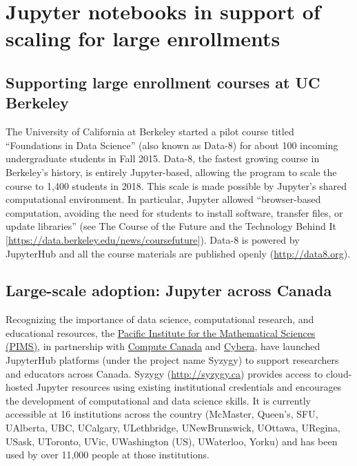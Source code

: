\documentclass[]{book}
\begin{document}
\section{Jupyter notebooks in support of scaling for large
enrollments}\label{jupyter-notebooks-in-support-of-scaling-for-large-enrollments}

\subsection{Supporting large enrollment courses at UC
Berkeley}\label{supporting-large-enrollment-courses-at-uc-berkeley}

The University of California at Berkeley started a pilot course titled
``Foundations in Data Science'' (also known as Data-8) for about 100
incoming undergraduate students in Fall 2015. Data-8, the fastest
growing course in Berkeley's history, is entirely Jupyter-based,
allowing the program to scale the course to 1,400 students in 2018. This
scale is made possible by Jupyter's shared computational environment. In
particular, Jupyter allowed ``browser-based computation, avoiding the
need for students to install software, transfer files, or update
libraries'' (see The Course of the Future and the Technology Behind It
{[}\url{https://data.berkeley.edu/news/coursefuture}{]}). Data-8 is
powered by JupyterHub and all the course materials are published openly
(\url{http://data8.org}).

\subsection{Large-scale adoption: Jupyter across
Canada}\label{large-scale-adoption-jupyter-across-canada}

Recognizing the importance of data science, computational research, and
educational resources, the \href{https://www.pims.math.ca/}{Pacific
Institute for the Mathematical Sciences (PIMS)}, in partnership with
\href{https://www.computecanada.ca/}{Compute Canada} and
\href{https://www.cybera.ca/}{Cybera}, have launched JupyterHub
platforms (under the project name Syzygy) to support researchers and
educators across Canada. Syzygy (\url{http://syzygy.ca}) provides access
to cloud-hosted Jupyter resources using existing institutional
credentials and encourages the development of computational and data
science skills. It is currently accessible at 16 institutions across the
country (McMaster, Queen's, SFU, UAlberta, UBC, UCalgary, ULethbridge,
UNewBrunswick, UOttawa, URegina, USask, UToronto, UVic, UWashington
(US), UWaterloo, Yorku) and has been used by over 11,000 people at those
institutions.
\end{document}
